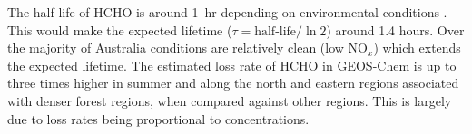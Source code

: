       
      
      The half-life of HCHO %
      is around 1~hr depending on environmental conditions \parencite{WHO_hcho_guidelines_2010}.
      This would make the expected lifetime ($\tau = \text{half-life}/\ln{2}$) around 1.4 hours.
      Over the majority of Australia conditions are relatively clean (low NO$_x$) which extends the expected lifetime.
      The estimated loss rate of HCHO in GEOS-Chem %
      is up to three times higher in summer and along the north and eastern regions associated with denser forest regions, when compared against other regions.
      This is largely due to loss rates being proportional to concentrations.
      
      
      
